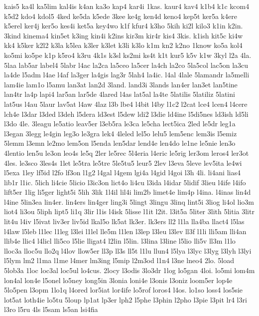 {kais5
ka4l
ka5lim
kal4is
k4an
ka3o
kap4
kar4i
1kas.
kaur4
kav4
k1b4
k1c
kcom4
k5d2
kdo4
kdol5
4ked
ke5da
k5ede
3kee
ke4g
ken4d
keno4
kep5t
ker5a
k4ere
k5erel
ker4j
ker5o
kes4i
ket5a
key4wo
k1f
kfur4
k3ho
5kih
ki2l
kilo3
k1in
k2in.
3kind
kinema4
kin5et
k3ing
kin4i
k2ins
kir3m
kir4r
kis4
3kis.
k1ish
kit5c
ki4w
kk4
k5ker
k2l2
k3la
k5lea
k3ler
k3let
k3li
k3lo
k1m
kn2
k2no
1know
ko5a
kol4
ko5mi
ko5pe
k1p
k5ro4
k3ru
4k1s
k3sl
ks2mi
ks4t
k1t
kur5
k5v
k1w
3kyl
l2a
4la.
5laa
lab5ar
label4
5labr
l4ac
la2ca
la5ceo
la5cer
la4ch
la2co
5la5col
lac5on
la3cu
la4de
l5adm
l4ae
l4af
la3ger
la4gis
lag3r
5lah4
la4ic.
l4al
4lale
5lamandr
la5melli
lam4ie
lam1o
l5amu
lan3at
lan2d
3land.
land3i
3lands
lan4er
lan3et
lan5tine
lan4tr
la4p
lapi4
lar5an
lar5de
4lared
l4as
lat5al
la4te
5latilis
5latiliz
5latini
lat5us
l4au
5laur
lav5at
l4aw
4laz
l3b
lbe4
l4bit
l4by
l1c2
l2cat
lce4
lcen4
l4cere
lch4e
l3dar
l3ded
l3deh
l5dera
ld3est
l5dew
ldi2
l3die
ld4ine
l5di5nes
ld3ish
ld5li
l3do
4le.
3leagu
le5atio
leav5er
l3eb5ra
le3ca
le5cha
lect5ica
2led
le5dr
leg1a
l3egan
3legg
le4gin
leg3o
le3gra
lek4
4leled
lel5o
lelu5
lem5enc
lem3is
l5emiz
5lemm
l3emn
le2mo
lem5on
l5enda
len5dar
lend4e
len4do
le1ne
le5nie
len3o
4lentio
len5u
le3on
leo4s
le5q
2ler
le5rec
5l4eria
l4eric
le5rig
ler3om
leros4
ler3ot
4les.
le3sco
3les4s
1let
le5tra
le5tre
5le5tu5
leur5
2lev
l3eva
5leve
lev5ita
le4wi
l5exa
1ley
lf5id
l2fo
lf3on
l1g2
l4gal
l4gem
lgi4a
l4gid
l4goi
l3h
4li.
li4ani
lias4
lib1r
l1ic.
5lich
li4cie
5licio
l3ic3on
lict4o
li4cu
l3ida
l4idar
5lidif
3lieu
l4ife
l4ifo
lift5er
1lig
li5ger
light5i
5lih
3lik
1l4il
lil4i
lim2b
limet4e
lim4p
l4ina.
l4inas
lin4d
l4ine
5lin3ea
lin4er.
lin4ers
lin4ger
ling3i
5lingt
3lingu
3linq
lint5i
3liog
li4ol
lio3m
liot4
li3ou
5liph
lipt5
li1q
3lir
l1is
l4isk
5lisse
l1it
l2it.
l3it5a
5liter
3lith
5litia
3litr
lit4u
l4iv
l5ivat
liv3er
liv5id
lkal5o
lk5at
lk3er.
lk3ers
ll2
l1la
lla4ba
llact4
l5las
l4law
l5leb
l1lec
l1leg
l3lei
l1lel
lle5m
l1len
l3lep
l3leu
l3lev
ll3f
l1li
lli5am
lli4an
llib4e
llic4
l4licl
lli5co
l5lie
lligat4
l2lin
l5lin.
l3lina
l3line
l5lio
lli5v
ll3m
l1lo
lloc3a
lloc5u
llo2q
l4lov
llow5er
ll3p
ll3s
ll5t
l1lu
llun4
l5lya
l3lyc
l3lyg
l3lyh
l3lyi
l5lym
lm2
l1ma
l1me
l4mer
lm3ing
l5mip
l2m3od
l1n4
l3ne
lneo4
2lo.
5load
5lob3a
1loc
loc3al
loc5ul
lo4cus.
2locy
l3odis
3lo3dr
1log
lo5gan
4loi.
lo5mi
lom4m
lon4al
lon4e
l5onel
lo5ney
long5in
3lonia
loni4e
l3onis
l3oniz
loom5er
lop4e
5lo5pen
l3opm
1lo1q
l4ored
lor5iat
lor4ife
lo5rof
loros4
l4os.
lo1so
loss4
los5sie
lot5at
loth4ie
lo5tu
5loup
lp1at
lp3er
lph2
l5phe
l3phin
l2pho
l3pie
l3pit
lr4
l3ri
l3ro
l5ru
4ls
l5sam
ls5an
lsi4fia
}
